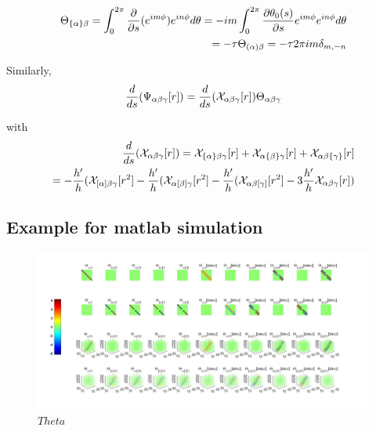 \documentclass{Note}
\begin{document}
\begin{equation}
\begin{aligned}
\Theta_{\{\alpha\}\beta}=\int_0^{2\pi} {\partial \over \partial s}(e^{im\phi}) e^{in\phi} d\theta
=-im\int_0^{2\pi} {\partial\theta_0(s) \over \partial s}e^{im\phi}e^{in\phi} d\theta\\
=-\tau  \Theta_{(\alpha)\beta}=-\tau 2\pi   im \delta_{m,-n}
\end{aligned}
\end{equation}

Similarly,
\begin{equation}
\begin{aligned}
{d\over ds}(\Psi_{\alpha\beta\gamma}[r])={d\over ds}(\mathcal{X}_{\alpha\beta\gamma}[r])\Theta_{\alpha\beta\gamma}
\end{aligned}
\end{equation}

with
\begin{equation}
\begin{aligned}
{d\over ds}(\mathcal{X}_{\alpha\beta\gamma}[r])
=\mathcal{X}_{\{\alpha\}\beta\gamma}[r]+\mathcal{X}_{\alpha\{\beta\}\gamma}[r]+\mathcal{X}_{\alpha\beta\{\gamma\}}[r]\\
=-{h'\over h}(\mathcal{X}_{[\alpha]\beta\gamma}[r^2]-{h'\over h}(\mathcal{X}_{\alpha[\beta]\gamma}[r^2]-{h'\over h}(\mathcal{X}_{\alpha\beta[\gamma]}[r^2]-3{h'\over h}\mathcal{X}_{\alpha\beta\gamma}[r])
\end{aligned}
\end{equation}

\subsection{Example for matlab simulation}
\begin{figure}
  \centerline{\includegraphics[width=8in]{ThetaFun.jpg}}
  \caption{$Theta$}
  \end{figure}
\end{document}
